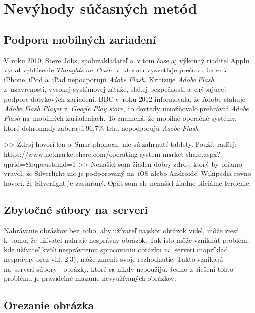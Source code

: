 \graphicspath{ {img/23/} }

\chapter{Nevýhody súčasných metód}
\section{Podpora mobilných zariadení}

V roku 2010, Steve Jobs, spoluzakladateľ a~v tom čase aj výkonný riaditeľ Applu vydal vyhlásenie \emph{Thoughts on Flash}\cite{Apple_flash}, v~ktorom vysvetľuje prečo zariadenia iPhone, iPod a~iPad nepodporujú \emph{Adobe Flash}. Kritizuje \emph{Adobe Flash} z~uzavrenosti, vysokej systémovej záťaže, slabej bezpečnosti a~chýbajúcej podpore dotykových zariadení.
BBC v~roku 2012 informovala\cite{Android_flash}, že Adobe sťahuje \emph{Adobe Flash Player} z~\emph{Google Play store}, čo dovtedy umožňovalo prehrávať \emph{Adobe Flash} na~mobilných zariadeniach. To znamená, že mobilné operačné systémy, ktoré dohromady zaberajú 96,7\% trhu\cite{Mobile_OS_share} nepodporujú \emph{Adobe Flash}.


>> Zdroj hovorí len o~Smartphonoch, nie sú zahrnuté tablety. Použiť radšej: https://www.netmarketshare.com/operating-system-market-share.aspx?qprid=8&qpcustomd=1
>> Nenašiel som žiaden dobrý zdroj, ktorý by priamo vravel, že Silverlight nie je podporovaný na~iOS alebo Androide. Wikipedia rovno hovorí, že Silverlight je zastaraný. Opäť som ale nenašiel žiadne oficiálne tvrdenie.


\section{Zbytočné súbory na~serveri}

Nahrávanie obrázkov bez~toho, aby užívateľ najskôr obrázok videl, môže viesť k~tomu, že užívateľ nahraje nesprávny obrázok. Tak isto môže vzniknúť problém, kde užívateľ kvôli nesprávnemu spracovaniu obrázku na~serveri (napríklad nesprávny orez viď. 2.3), môže zmeniť svoje rozhodnutie. Takto vznikajú na~serveri súbory - obrázky, ktoré sa nikdy nepoužijú. Jedno z~riešení tohto problému je pravidelné mazanie nevyužívaných obrázkov.   

\section{Orezanie obrázka}

